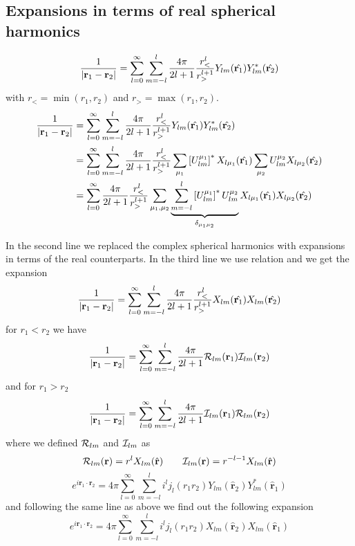 \subsection{Expansions in terms of real spherical harmonics}
\begin{equation}
\frac{1}{|{\bf r}_1-{\bf
    r}_2|}=\sum_{l=0}^{\infty}\sum_{m=-l}^{l}\frac{4\pi}{2l+1}\frac{r_<^l}{r_>^{l+1}}Y_{lm}(\hat{{\bf r}_1})Y_{lm}^{*}(\hat{{\bf r}_2})
\end{equation}
with $r_<=\min (r_1,r_2)$ and $r_>=\max (r_1,r_2)$.
\begin{equation}
\begin{split}
\frac{1}{|{\bf r}_1-{\bf
    r}_2|}&=\sum_{l=0}^{\infty}\sum_{m=-l}^{l}\frac{4\pi}{2l+1}\frac{r_<^l}{r_>^{l+1}}Y_{lm}(\hat{{\bf
    r}_1})Y_{lm}^{*}(\hat{{\bf r}_2})\\
&=\sum_{l=0}^{\infty}\sum_{m=-l}^{l}\frac{4\pi}{2l+1}\frac{r_<^l}{r_>^{l+1}}\sum_{\mu_1}\left[
    U_{lm}^{\mu_1}\right]^{*}X_{l\mu_1}(\hat{{\bf r}_1})\sum_{\mu_2}
    U_{lm}^{\mu_2}X_{l\mu_2}(\hat{{\bf r}_2})\\
&=\sum_{l=0}^{\infty}\frac{4\pi}{2l+1}\frac{r_<^l}{r_>^{l+1}}\sum_{\mu_1,\mu_2}\underbrace{\sum_{m=-l}^{l}\left[
    U_{lm}^{\mu_1}\right]^{*}U_{lm}^{\mu_2}}_{\delta_{\mu_1\mu_2}}X_{l\mu_1}(\hat{{\bf r}_1})X_{l\mu_2}(\hat{{\bf r}_2})
\end{split}
\end{equation}
\par{In the second line we replaced the complex spherical harmonics with expansions
in terms of the real counterparts. In the third line we use relation
 and we get the expansion}
\begin{equation}
\label{rcoulomb}
\frac{1}{|{\bf r}_1-{\bf
    r}_2|}=\sum_{l=0}^{\infty}\sum_{m=-l}^{l}\frac{4\pi}{2l+1}\frac{r_<^l}{r_>^{l+1}}X_{lm}(\hat{{\bf
    r}_1})X_{lm}(\hat{{\bf r}_2})
\end{equation}
for $r_1<r_2$ we have
\begin{equation}
 \frac{1}{|{\bf r}_1-{\bf
    r}_2|}=\sum_{l=0}^{\infty}\sum_{m=-l}^{l}\frac{4\pi}{2l+1}\mathcal{R}_{lm}({\bf
    r}_1)\mathcal{I}_{lm}({\bf r}_2)
\end{equation}
and for $r_1>r_2$
\begin{equation}
 \frac{1}{|{\bf r}_1-{\bf
    r}_2|}=\sum_{l=0}^{\infty}\sum_{m=-l}^{l}\frac{4\pi}{2l+1}\mathcal{I}_{lm}({\bf
    r}_1)\mathcal{R}_{lm}({\bf r}_2)
\end{equation}
where we defined $\mathcal{R}_{lm}$ and $\mathcal{I}_{lm}$ as
\begin{equation}
\mathcal{R}_{lm}({\bf r})=r^lX_{lm}(\hat{{\bf r}})\qquad \mathcal{I}_{lm}({\bf r})=r^{-l-1}X_{lm}(\hat{{\bf r}})
\end{equation}
\begin{equation}
e^{i\bm{r}_1\cdot\bm{r}_2}=4\pi\sum_{l=0}^{\infty}\sum_{m=-l}^{l}i^lj_l(r_1r_2)Y_{lm}(\hat{\bm{r}}_2)Y_{lm}^{*}(\hat{\bm{r}}_1)
\end{equation}
and following the same line as above we find out the following expansion
\begin{equation}
\label{rwave}
e^{i\bm{r}_1\cdot\bm{r}_2}=4\pi\sum_{l=0}^{\infty}\sum_{m=-l}^{l}i^lj_l(r_1r_2)X_{lm}(\hat{\bm{r}}_2)X_{lm}(\hat{\bm{r}}_1)
\end{equation}
